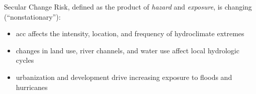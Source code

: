 \begin{block}{Secular Change}
  Risk, defined as the product of \emph{hazard} and \emph{exposure}, is changing (``nonstationary''):
  \begin{itemize}
    \item \gls{acc} affects the intensity, location, and frequency of hydroclimate extremes \cite{Held:2006jo, OGorman:2009hj}
    \item changes in land use, river channels, and water use affect local hydrologic cycles \cite{Merz:2014gf}
    \item urbanization and development drive increasing exposure to floods \cite{Jongman:2012cr} and hurricanes \cite{Peduzzi:2012iq}
  \end{itemize}
\end{block}